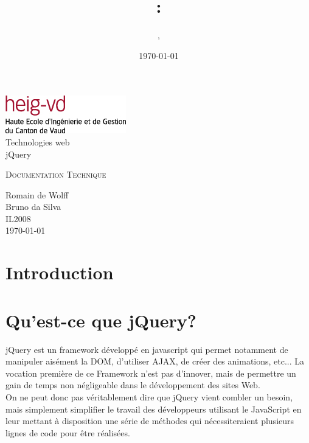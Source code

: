 \documentclass[10pt,a4paper,titlepage]{article}
\author{\auteurOne, \auteurTwo}
\title{\branchetag : \laboname}
\date{\today}
\newcommand{\branche}{Technologies web}
\newcommand{\laboname}{jQuery}
\newcommand{\auteurOne}{Romain de Wolff}
\newcommand{\auteurTwo}{Bruno da Silva}
\newcommand{\promo}{IL2008}
\begin{document}
\pagestyle{headings}
\begin{titlepage}
	\begin{center}
	\includegraphics{img/logo-HEIG-VD.jpg}\\
		\vspace{3cm}
		\LARGE \branche %
		\vspace{3cm}\\
		\Huge \laboname \\
		\vspace{3cm}

		\Large \textsc{Documentation Technique} \\
		\vspace{3cm}

		\large \auteurOne \\
		\auteurTwo \\	
		\vspace{10pt}
		\normalsize \textsc{\promo} \\

		\vspace{2cm}
		\today
	\end{center}
\end{titlepage}

\tableofcontents
\newpage
\pagestyle{fancy}
\section{Introduction}

\section{Qu'est-ce que jQuery?}\label{jQuery}
jQuery est un framework développé en javascript qui permet notamment de manipuler aisément la DOM, d'utiliser AJAX, de créer des animations, etc...
La vocation première de ce Framework n'est pas d'innover, mais de permettre un gain de temps non négligeable dans le développement des sites Web.\\

On ne peut donc pas véritablement dire que jQuery vient combler un besoin, mais simplement simplifier le travail des développeurs utilisant le JavaScript en leur mettant à disposition une série de méthodes qui nécessiteraient plusieurs lignes de code pour être réalisées.
\end{document}
